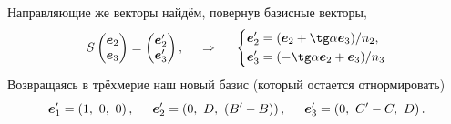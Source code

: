 Направляющие же векторы найдём, повернув базисные векторы, 
\begin{equation*}
    S \begin{pmatrix}
        \vc{e}_2 \\ \vc{e}_3
    \end{pmatrix} = 
    \begin{pmatrix}
        \vc{e}_2' \\ \vc{e}_3'
    \end{pmatrix},
    \hspace{0.5cm} \Rightarrow \hspace{0.5cm} 
    \left\{\begin{aligned}
        \vc{e}_2' &= (\vc{e}_2 + \tg \alpha \vc{e}_3) / n_2, \\
        \vc{e}_3' &= (-\tg \alpha \vc{e}_2 + \vc{e}_3) / n_3
    \end{aligned}\right.
\end{equation*}
Возвращаясь в трёхмерие наш новый базис (который остается отнормировать)
\begin{equation}
    \mbox{\boldmath $e$}_1' = \left(1,\ 0,\ 0\right), \hspace{0.5cm} 
    \mbox{\boldmath $e$}_2' = \left(0,\ D,\ (B'-B)\right), \hspace{0.5cm} 
    \mbox{\boldmath $e$}_3' = \left(0,\ C'-C,\ D\right).
\end{equation}

